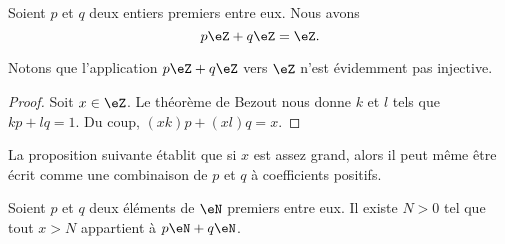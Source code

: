 \begin{corollary}       \label{CorgEMtLj}
    Soient \( p\) et \( q\) deux entiers premiers entre eux. Nous avons
    \begin{equation}
        p\eZ+q\eZ=\eZ.
    \end{equation}
\end{corollary}

Notons que l'application \( p\eZ+q\eZ\) vers \( \eZ\) n'est évidemment pas injective.

\begin{proof}
    Soit \( x\in \eZ\). Le théorème de Bezout nous donne \( k\) et \( l\) tels que \( kp+lq=1\). Du coup, \( (xk)p+(xl)q=x\).
\end{proof}

La proposition suivante établit que si \( x\) est assez grand, alors il peut même être écrit comme une combinaison de \( p\) et \( q\) à coefficients positifs.
\begin{proposition}     \label{PropLAbRSE}
    Soient \( p\) et \( q\) deux éléments de \( \eN\) premiers entre eux. Il existe \( N>0\) tel que tout \( x>N\) appartient à \( p\eN+q\eN\).
\end{proposition}

